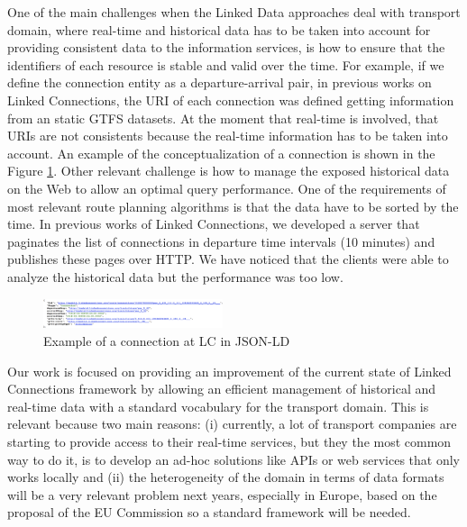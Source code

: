 \documentclass[sw]{iosart2x}
\begin{document}
One of the main challenges when the Linked Data approaches deal with transport domain, where real-time and historical data has to be taken into account for providing consistent data to the information services, is how to ensure that the identifiers of each resource is stable and valid over the time. For example, if we define the connection entity as a departure-arrival pair, in previous works on Linked Connections\cite{colpaert2015intermodal}, the URI of each connection was defined getting information from an static GTFS datasets. At the moment that real-time is involved, that URIs are not consistents because the real-time information has to be taken into account. An example of the conceptualization of a connection is shown in the Figure \ref{fig:connection}. Other relevant challenge is how to manage the exposed historical data on the Web to allow an optimal query performance. One of the requirements of most relevant route planning algorithms is that the data have to be sorted by the time. In previous works of Linked Connections\cite{rojas2017providing}, we developed a server that paginates the list of connections in departure time intervals (10 minutes) and publishes these pages over HTTP. We have noticed that the clients were able to analyze the historical data but the performance was too low.

\begin{figure}[t]
	\includegraphics[width=0.47\textwidth]{images/connection.png}
	\caption{Example of a connection at LC in JSON-LD}\label{fig:connection}
\end{figure}

Our work is focused on providing an improvement of the current state of Linked Connections framework by allowing an efficient management of historical and real-time data with a standard vocabulary for the transport domain. This is relevant because two main reasons: (i) currently, a lot of transport companies are starting to provide access to their real-time services, but they the most common way to do it, is to develop an ad-hoc solutions like APIs or web services that only works locally \cite{colpaert2016public} and (ii) the heterogeneity of the domain in terms of data formats will be a very relevant problem next years, especially in Europe, based on the proposal of the EU Commission so a standard framework will be needed.  
\end{document}
